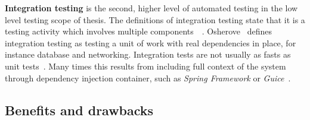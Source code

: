     \textbf{Integration testing} is the second, higher level of automated testing in the low level testing scope of thesis.
    The definitions of integration testing state that it is a testing
    activity which involves multiple components~\cite{whittaker2000software}~\cite{artofunit2013}. Osherove~\cite{artofunit2013}
    defines integration testing as testing a unit of work with real dependencies in place, for instance database and  networking.
    Integration tests are not usually as fasts as unit tests~\cite{artofunit2013}. Many times this results from including
    full context of the system through dependency injection container, such as \textit{Spring Framework} or \textit{Guice}~\cite{kapelonis2016java}.

    \subsection{Benefits and drawbacks}

